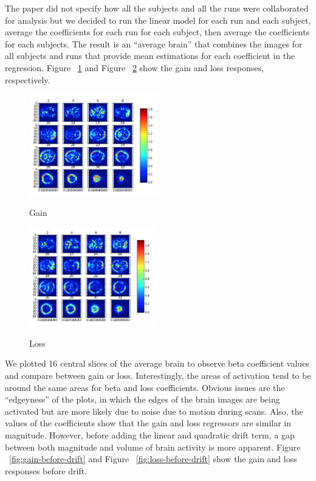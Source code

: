 \documentclass[11pt]{article}
\begin{document}
The paper did not specify how all the subjects and all the runs were
collaborated for analysis but we decided to run the linear model for each run
and each subject, average the coefficients for each run for each subject, then
average the coefficients for each subjects. The result is an ``average brain''
that combines the images for all subjects and runs that provide mean
estimations for each coefficient in the regression. Figure ~\ref{fig:gain} and
Figure ~\ref{fig:loss} show the gain and loss responses, respectively.

\begin{figure}[h]
\caption{Gain}
\centering
\includegraphics[width=0.5\textwidth]{gain.png}
\label{fig:gain}
\end{figure}

\begin{figure}[h]
\caption{Loss}
\centering
\includegraphics[width=0.5\textwidth]{loss.png}
\label{fig:loss}
\end{figure}

We plotted 16 central slices of the average brain to observe beta coefficient
values and compare between gain or loss. Interestingly, the areas of activation
tend to be around the same areas for beta and loss coefficients. Obvious issues
are the ``edgeyness'' of the plots, in which the edges of the brain images are
being activated but are more likely due to noise due to motion during scans.
Also, the values of the coefficients show that the gain and loss regressors are
similar in magnitude. However, before adding the linear and quadratic drift
term, a gap between both magnitude and volume of brain activity is more
apparent. Figure ~\ref{fig:gain-before-drift} and Figure
~\ref{fig:loss-before-drift} show the gain and loss responses before drift.
\end{document}
